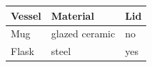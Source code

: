 \begin{tabular}{|l|l|l|}
    \hline
    Vessel & Material & Lid \\
    \hline
    Mug & glazed ceramic & no \\
    \hline
    Flask & steel & yes \\
    \hline
\end{tabular}
